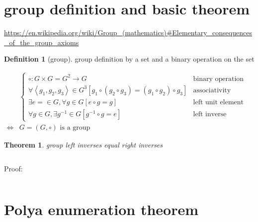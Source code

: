 \documentclass[
]{book}
\newtheorem{theorem}{Theorem}[chapter]
\theoremstyle{definition}
\newtheorem{definition}{Definition}[chapter]
\theoremstyle{definition}
\theoremstyle{definition}
\theoremstyle{definition}
\theoremstyle{remark}
\begin{document}
\hypertarget{group-definition-and-basic-theorem}{%
\section{group definition and basic theorem}\label{group-definition-and-basic-theorem}}

\url{https://en.wikipedia.org/wiki/Group_(mathematics)\#Elementary_consequences_of_the_group_axioms}

\begin{definition}[group]
\protect\hypertarget{def:unnamed-chunk-1}{}\label{def:unnamed-chunk-1}group definition by a set and a binary operation on the set
\end{definition}

\[
\begin{aligned}
 & \begin{cases}
\circ:G\times G=G^{2}\rightarrow G & \text{binary operation}\\
\forall\left\langle g_{{\scriptscriptstyle 1}},g_{{\scriptscriptstyle 2}},g_{{\scriptscriptstyle 3}}\right\rangle \in G^{3}\left[g_{{\scriptscriptstyle 1}}\circ\left(g_{{\scriptscriptstyle 2}}\circ g_{{\scriptscriptstyle 3}}\right)=\left(g_{{\scriptscriptstyle 1}}\circ g_{{\scriptscriptstyle 2}}\right)\circ g_{{\scriptscriptstyle 3}}\right] & \text{associativity}\\
\exists e=\in G,\forall g\in G\left[e\circ g=g\right] & \text{left unit element}\\
\forall g\in G,\exists g^{-1}\in G\left[g^{-1}\circ g=e\right] & \text{left inverse (element)}
\end{cases}\\
\Leftrightarrow & G=\left(G,\circ\right)\text{ is a group}
\end{aligned}
\]

\begin{theorem}
\protect\hypertarget{thm:unnamed-chunk-2}{}\label{thm:unnamed-chunk-2}group left inverses equal right inverses
\end{theorem}

\[
\
\]

Proof:

\[
\ \tag*{$\Box$}
\]

\hypertarget{polya-enumeration-theorem}{%
\section{Polya enumeration theorem}\label{polya-enumeration-theorem}}
\end{document}
